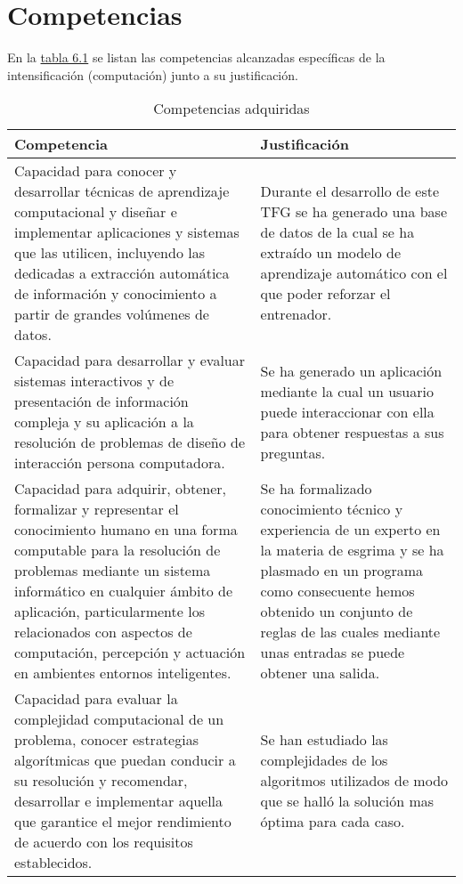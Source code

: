 \section{Competencias}
En la \hyperref[tab:competencias adquiridas]{tabla 6.1} se listan las competencias alcanzadas específicas de la intensificación
(computación) junto a su justificación.

\newpage

\begin{longtable}{p{} p{}}
  \caption{Competencias adquiridas}
  \label{tab:competencias adquiridas}

  \endfirsthead
  \endhead

  \textbf{Competencia} & \textbf{Justificación} \\
  \hline
  \rowcolor[HTML]{D6D6D6}
  Capacidad para conocer y desarrollar técnicas de aprendizaje computacional y diseñar e implementar aplicaciones y sistemas que las utilicen, incluyendo las dedicadas a extracción automática de información y conocimiento a partir de grandes volúmenes de datos. & Durante el desarrollo de este \acs{TFG} se ha generado una base de datos de la cual se ha extraído un modelo de aprendizaje automático con el que poder reforzar el entrenador.\\

  Capacidad para desarrollar y evaluar sistemas interactivos y de presentación de información compleja y su aplicación a la resolución de problemas de diseño de interacción persona computadora. & Se ha generado un aplicación mediante la cual un usuario puede interaccionar con ella para obtener respuestas a sus preguntas.\\

  \rowcolor[HTML]{D6D6D6}
  Capacidad para adquirir, obtener, formalizar y representar el conocimiento humano en una forma computable para la resolución de problemas mediante un sistema informático en cualquier ámbito de aplicación, particularmente los relacionados con aspectos de computación, percepción y actuación en ambientes entornos inteligentes. &  Se ha formalizado conocimiento técnico y experiencia de un experto en la materia de esgrima y se ha plasmado en un programa como consecuente hemos obtenido un conjunto de reglas de las cuales mediante unas entradas se puede obtener una salida.  \\

  Capacidad para evaluar la complejidad computacional de un problema, conocer estrategias algorítmicas que puedan conducir a su resolución y recomendar, desarrollar e implementar aquella que garantice el mejor rendimiento de acuerdo con los requisitos establecidos. & Se han estudiado las complejidades de los algoritmos utilizados de modo que se halló la solución mas óptima para cada caso. \\

  \hline
\end{longtable}




